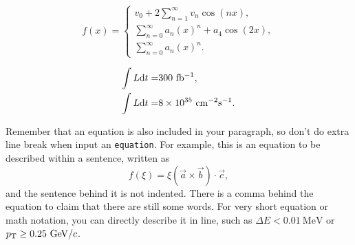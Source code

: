 \begin{equation}
f(x)=\left\{
\begin{array}{l}
v_{0} + 2\sum\limits_{n=1}^\infty v_{n}\cos{(nx)}, \\
\sum\limits_{n=0}^\infty a_{n}(x)^n + a_{4} \cos{(2x)}, \\
\sum\limits_{n=0}^\infty a_{n}(x)^n.
\end{array} \right.
\label{eqn:eqn}
\end{equation}

\begin{equation}
\begin{aligned}
\int L \text{d}t = &  300~\rm fb^{-1}, \\
\int L \text{d}t = &  8\times10^{35}~\text{cm}^{-2} \text{s}^{-1}. 
\end{aligned}
\label{eqn:eqn2}
\end{equation}

Remember that an equation is also included in your paragraph, so don't do extra line break when input an {\tt equation}. For example, this is an equation to be described within a sentence, written as
\begin{equation}
f(\xi)=\xi(\Vec{a}\times\Vec{b})\cdot\Vec{c},
\label{eqn:eqn3}
\end{equation}
and the sentence behind it is not indented. There is a comma behind the equation to claim that there are still some words. For very short equation or math notation, you can directly describe it in line, such as $\Delta E< 0.01~\text{MeV}$ or $p_{\rm T} \ge 0.25~\text{GeV}/c$.